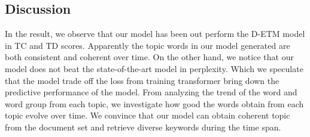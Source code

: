 \subsection{Discussion}
In the result, we observe that our model has been out perform the D-ETM model in TC and TD scores. Apparently the topic words in our model generated are both consistent  and coherent over time.
On the other hand, we notice that our model does not beat the state-of-the-art model in perplexity. Which we speculate that the model trade off the loss from training transformer bring down the predictive performance of the model.
From analyzing the trend of the word and word group from each topic, we investigate how good the words obtain from each topic evolve over time. We convince that our model can obtain coherent topic from the document set and retrieve diverse keywords during the time span.